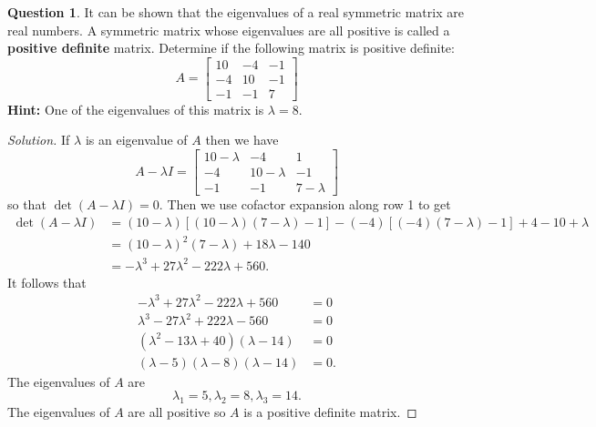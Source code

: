\documentclass{article}
\theoremstyle{definition}
\newtheorem{question}{Question}
\newcommand{\0}{\textbf{0}}
\begin{document}
\vspace{.75cm}

\label{Question 2}



\begin{question} It can be shown that the eigenvalues of a real symmetric matrix are real numbers. A symmetric matrix whose eigenvalues are all positive is called a {\bf positive definite} matrix. Determine if the following matrix is positive definite: \[A = \left[\begin{array}{rrr} 10 & -4 & -1 \\ -4 & 10 & -1 \\ -1 & -1 & 7 \end{array}\right]\] {\bf Hint:} One of the eigenvalues of this matrix is $\lambda = 8$.

\begin{proof}[Solution]
    If \(\lambda\) is an eigenvalue of \(A\) then we have
    \[A-\lambda I = 
    \begin{bmatrix}
        10-\lambda & -4 & 1 \\
        -4 & 10-\lambda & -1 \\
        -1 & -1 & 7-\lambda
    \end{bmatrix}\]
    so that \(\det(A-\lambda I)=0\). Then we use cofactor expansion along row 1 to get
    \begin{align*}
        \det(A-\lambda I) &= (10-\lambda)[(10-\lambda)(7-\lambda)-1]-(-4)[(-4)(7-\lambda)-1]+4-10+\lambda \\
        &= (10-\lambda)^2(7-\lambda)+18\lambda-140 \\
        &= -\lambda^3+27\lambda^2-222\lambda+560.
    \end{align*} It follows that
    \begin{align*}
        -\lambda^3+27\lambda^2-222\lambda+560 &= 0 \\
        \lambda^3-27\lambda^2+222\lambda-560 &= 0 \\
        (\lambda^2-13\lambda+40)(\lambda-14) &= 0 \\
        (\lambda-5)(\lambda-8)(\lambda-14) &= 0.
    \end{align*} The eigenvalues of \(A\) are
    \[\lambda_1=5, \lambda_2=8, \lambda_3=14.\]
    The eigenvalues of \(A\) are all positive so \(A\) is a positive definite matrix.
\end{proof}

\end{question}
\end{document}
